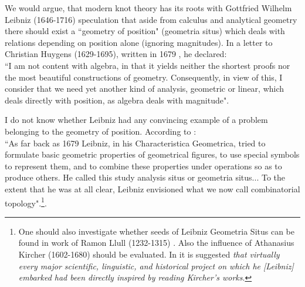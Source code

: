 \documentclass[12pt]{amsart}
\begin{document}
We would argue, that modern knot theory has its roots with
 Gottfried Wilhelm Leibniz (1646-1716) speculation that aside from calculus
and analytical geometry there should exist a ``geometry of position"
(geometria situs) which deals with relations depending on position
alone (ignoring magnitudes). In a letter to Christian Huygens (1629-1695),
written in 1679 \cite{Lei}, he declared:\\
``I am not content with algebra,  in that it yields neither the shortest
proofs nor the most beautiful constructions of geometry.
Consequently, in view of this, I consider that we need yet
another kind of analysis, geometric or linear, which deals directly
with position, as algebra deals with magnitude".


   I do not know whether Leibniz had any convincing example of a problem
belonging to the geometry of position. According to \cite{Kli}:\\
``As far back as 1679 Leibniz, in his Characteristica Geometrica,
tried to formulate basic geometric properties of geometrical figures,
to use special symbols to represent them,  and to combine these
properties under operations so as to produce others.
He called this study analysis situs or geometria
situs...  To the extent that he was at all clear, Leibniz envisioned what
we now call combinatorial topology".\footnote{One should also investigate whether
seeds of Leibniz Geometria Situs can be found in work of Ramon Llull (1232-1315) \cite{Bon}.
Also the influence of Athanasius Kircher (1602-1680) should be evaluated. In \cite{Fin,Gla} it is suggested
{\it that virtually every major scientific, linguistic, and historical project
on which he [Leibniz] embarked had been directly inspired by reading Kircher's works}. }.
\end{document}
